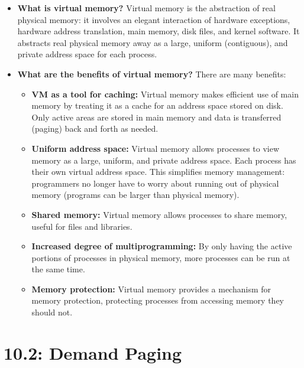 \documentclass[12pt]{article}
\begin{document}
\begin{itemize}
    \item \textbf{What is virtual memory?} Virtual memory is the abstraction of real physical memory: it involves an elegant interaction of hardware exceptions, hardware address translation, main memory, disk files, and kernel software. It abstracts real physical memory away as a large, uniform (contiguous), and private address space for each process.
    \item \textbf{What are the benefits of virtual memory?} There are many benefits:
        \begin{itemize}
            \item \textbf{VM as a tool for caching:} Virtual memory makes efficient use of main memory by treating it as a cache for an address space stored on disk. Only active areas are stored in main memory and data is transferred (paging) back and forth as needed.
            \item \textbf{Uniform address space:} Virtual memory allows processes to view memory as a large, uniform, and private address space. Each process has their own virtual address space. This simplifies memory management: programmers no longer have to worry about running out of physical memory (programs can be larger than physical memory).
            \item \textbf{Shared memory:} Virtual memory allows processes to share memory, useful for files and libraries.
            \item \textbf{Increased degree of multiprogramming:} By only having the active portions of processes in physical memory, more processes can be run at the same time.
            \item \textbf{Memory protection:} Virtual memory provides a mechanism for memory protection, protecting processes from accessing memory they should not.
        \end{itemize}
\end{itemize}
 
\section*{10.2: Demand Paging}
\end{document}
